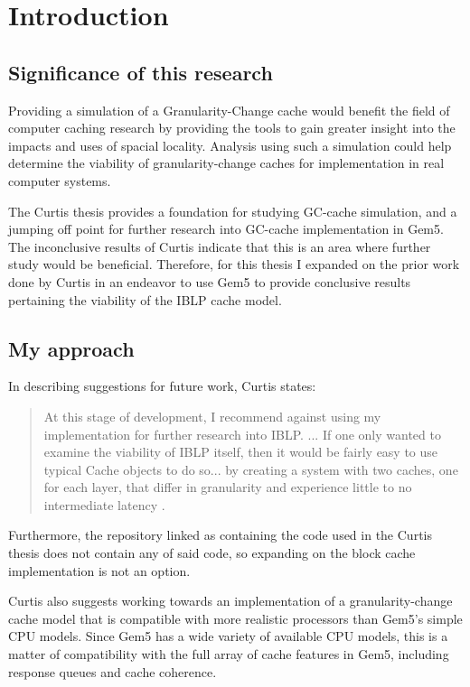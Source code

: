 \documentclass[12pt,twoside]{reedthesis}
\begin{document}
	\vfill

\chapter{Introduction}

\section{Significance of this research}

Providing a simulation of a Granularity-Change cache would benefit the field of computer caching research by providing the tools to gain greater insight into the impacts and uses of spacial locality. Analysis using such a simulation could help determine the viability of granularity-change caches for implementation in real computer systems.

The Curtis thesis provides a foundation for studying GC-cache simulation, and a jumping off point for further research into GC-cache implementation in Gem5. The inconclusive results of Curtis indicate that this is an area where further study would be beneficial. Therefore, for this thesis I expanded on the prior work done by Curtis in an endeavor to use Gem5 to provide conclusive results pertaining the viability of the IBLP cache model.

\section{My approach}

	In describing suggestions for future work, Curtis states: \begin{quote}
		At this stage of development, I recommend against using my implementation for further research into IBLP. ... If one only wanted to examine the viability of IBLP itself, then it would be fairly easy to use typical Cache objects to do so... by creating a system with two caches, one for each layer, that differ in granularity and experience little to no intermediate latency \cite{curtis}.
	\end{quote}

	Furthermore, the repository linked as containing the code used in the Curtis thesis does not contain any of said code, so expanding on the block cache implementation is not an option.

	Curtis also suggests working towards an implementation of a granularity-change cache model that is compatible with more realistic processors than Gem5's simple CPU models. Since Gem5 has a wide variety of available CPU models, this is a matter of compatibility with the full array of cache features in Gem5, including response queues and cache coherence.
\end{document}
